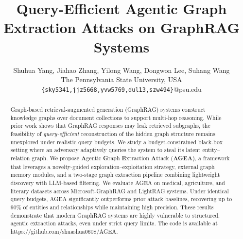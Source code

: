 \documentclass[11pt]{article}
\title{Query-Efficient Agentic Graph Extraction Attacks on GraphRAG Systems}
\author{
    Shuhua Yang,
    Jiahao Zhang,
    Yilong Wang,
    Dongwon Lee,
    Suhang Wang
    \\
    The Pennsylvania State University, USA\\
    \texttt{\{sky5341,jjz5668,yvw5769,dul13,szw494\}}@psu.edu
}
\begin{document}
\maketitle
\begin{abstract}
Graph-based retrieval-augmented generation (GraphRAG) systems construct knowledge graphs over document collections to support multi-hop reasoning. While prior work shows that GraphRAG responses may leak retrieved subgraphs, the feasibility of \emph{query-efficient} reconstruction of the hidden graph structure remains unexplored under realistic query budgets.
We study a budget-constrained black-box setting where an adversary adaptively queries the system to steal its latent entity–relation graph.
We propose \textbf{A}gentic \textbf{G}raph \textbf{E}xtraction \textbf{A}ttack (\textbf{AGEA}), a framework that leverages a novelty-guided exploration–exploitation strategy, external graph memory modules, and a two-stage graph extraction pipeline combining lightweight discovery with LLM-based filtering. We evaluate AGEA on medical, agriculture, and literary datasets across Microsoft-GraphRAG and LightRAG systems. Under identical query budgets, AGEA significantly outperforms prior attack baselines, recovering up to 90\% of entities and relationships while maintaining high precision. 
These results demonstrate that modern GraphRAG systems are highly vulnerable to structured, agentic extraction attacks, even under strict query limits. 
The code is available at https://github.com/shuashua0608/AGEA. 



\end{abstract}
\end{document}
